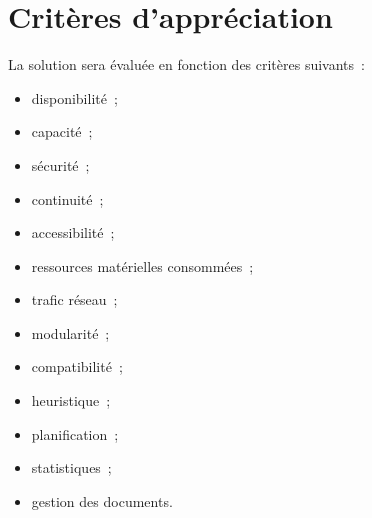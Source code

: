 \section{Critères d'appréciation}
La solution sera évaluée en fonction des critères suivants~:
\begin{itemize}
	\item disponibilité~;
	\item capacité~;
	\item sécurité~;
	\item continuité~;
	\item accessibilité~;
	\item ressources matérielles consommées~;
	\item trafic réseau~;
	\item modularité~;
	\item compatibilité~;
	\item heuristique~;
	\item planification~;
	\item statistiques~;
	\item gestion des documents.
\end{itemize}

